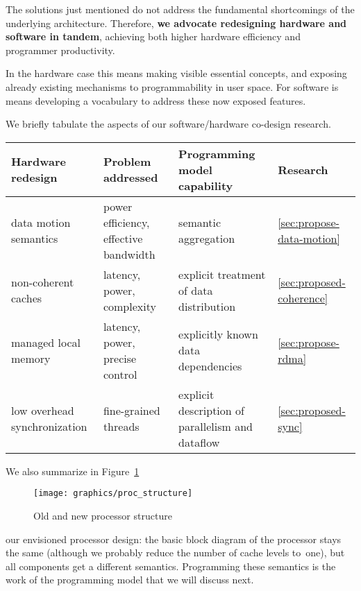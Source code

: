 The solutions just mentioned do not address the fundamental 
shortcomings of the underlying architecture.
Therefore, \textbf{we advocate redesigning hardware and software
in tandem}, achieving both higher hardware efficiency and programmer
productivity. 

In the hardware case this means making visible
essential concepts, and exposing already existing
mechanisms to programmability in user space. For software is means
developing a vocabulary to address these now exposed features.

We briefly tabulate the aspects of our software/hardware co-design research.

\def\w{}
\begin{tabular}{|p{\w}|p{\w}|p{\w}|p{}|}

\hline
Hardware redesign&Problem addressed&Programming model capability&Research\\
\hline\hline

data motion semantics&power efficiency, effective bandwidth&semantic aggregation
  &\ref{sec:propose-data-motion}\\ \hline

non-coherent caches& latency, power, complexity &explicit treatment of data distribution
  &\ref{sec:proposed-coherence}\\ \hline

managed local memory&latency, power, precise control
  &explicitly known data dependencies
  &\ref{sec:propose-rdma}\\ \hline


low overhead synchronization&fine-grained threads&explicit description
    of parallelism and dataflow
  &\ref{sec:proposed-sync}\\
\hline
\end{tabular}

We also summarize in Figure~\ref{fig:structure}
\begin{figure}[ht]
\texttt{[image: graphics/proc\_structure]}
\caption{Old and new processor structure}
\label{fig:structure}
\end{figure}
our envisioned processor design: the basic block diagram of the processor
stays the same (although we probably reduce the number of cache levels
to~one), but all components get a different semantics.
Programming these semantics is the work of the programming model
that we will discuss next.


